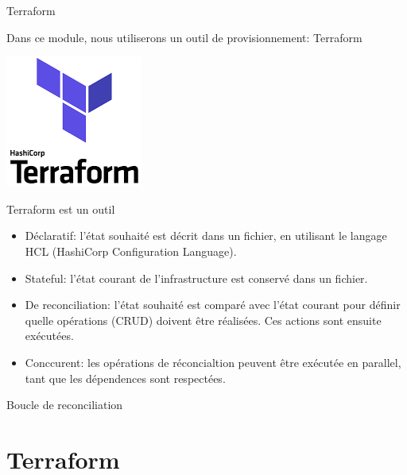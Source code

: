 \documentclass[aspectratio=169,10pt]{beamer}
\begin{document}
\begin{frame}{Terraform}

Dans ce module, nous utiliserons un outil de provisionnement: Terraform

\begin{center}
\includegraphics[scale=0.4]{images/terraform.png}
\end{center}

Terraform est un outil

\begin{itemize}
    \item \alert{Déclaratif}: l'état souhaité est décrit dans un fichier, en utilisant le langage \alert{HCL} (HashiCorp Configuration Language). 
    \item \alert{Stateful}: l'état courant de l'infrastructure est conservé dans un fichier. 
    \item De \alert{reconciliation}: l'état souhaité est comparé avec l'état courant pour définir quelle opérations (CRUD) doivent être réalisées. Ces actions sont ensuite exécutées. 
    \item \alert{Conccurent}: les opérations de réconcialtion peuvent être exécutée en parallel, tant que les dépendences sont respectées. 
\end{itemize}

\end{frame}
\begin{frame}{Boucle de reconciliation}


\end{frame}

\section{Terraform}
\end{document}
